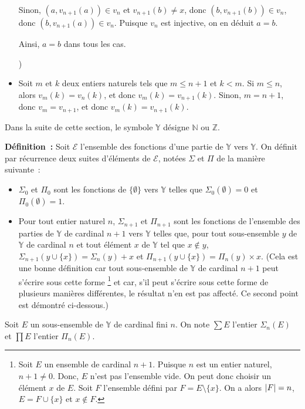 \begin{itemize}[nosep]
{            Sinon, $(a,v_{n+1}(a)) \in v_n$ et $v_{n+1}(b) \neq x$, donc $(b,v_{n+1}(b)) \in v_n$, donc $(b,v_{n+1}(a)) \in v_n$. 
            Puisque $v_n$ est injective, on en déduit $a = b$. 

            Ainsi, $a = b$ dans tous les cas.
            })
        \item Soit $m$ et $k$ deux entiers naturels tels que $m \leq n + 1$ et $k < m$. 
            Si $m \leq n$, alors $v_m(k) = v_n(k)$, et donc $v_m(k) = v_{n+1}(k)$. 
            Sinon, $m = n+1$, donc $v_m = v_{n+1}$, et donc $v_m(k) = v_{n+1}(k)$.
    \end{itemize}

   \done 

\medskip

Dans la suite de cette section, le symbole $\mathbb{Y}$ désigne $\mathbb{N}$ ou $\mathbb{Z}$.

\medskip

\noindent\textbf{Définition :} Soit $\mathcal{E}$ l'ensemble des fonctions d'une partie de $\mathbb{Y}$ vers $\mathbb{Y}$. 
    On définit par récurrence deux suites d'éléments de $\mathcal{E}$, notées $\Sigma$ et $\Pi$ de la manière suivante : 
    \begin{itemize}[nosep]
        \item $\Sigma_0$ et $\Pi_0$ sont les fonctions de $\lbrace \emptyset \rbrace$ vers $\mathbb{Y}$ telles que $\Sigma_0(\emptyset) = 0$ et $\Pi_0(\emptyset) = 1$.
        \item Pour tout entier naturel $n$, $\Sigma_{n+1}$ et $\Pi_{n+1}$ sont les fonctions de l'ensemble des parties de $\mathbb{Y}$ de cardinal $n+1$ vers $\mathbb{Y}$ telles que, pour tout sous-ensemble $y$ de $\mathbb{Y}$ de cardinal $n$ et tout élément $x$ de $\mathbb{Y}$ tel que $x \notin y$, $\Sigma_{n+1} (y \cup \lbrace x \rbrace) = \Sigma_n (y) + x$ et $\Pi_{n+1} (y \cup \lbrace x \rbrace) = \Pi_n (y) \times x$. 
        (Cela est une bonne définition car tout sous-ensemble de $\mathbb{Y}$ de cardinal $n+1$ peut s'écrire sous cette forme%
        \footnote{
            Soit $E$ un ensemble de cardinal $n+1$. 
            Puisque $n$ est un entier naturel, $n+1 \neq 0$. 
            Donc, $E$ n'est pas l'ensemble vide.
            On peut donc choisir un élément $x$ de $E$. 
            Soit $F$ l'ensemble défini par $F = E \setminus \lbrace x \rbrace$.
            On a alors $\left\lvert F \right\rvert = n$, $E = F \cup \lbrace x \rbrace$ et $x \notin F$.
        }
        et car, s'il peut s'écrire sous cette forme de plusieurs manières différentes, le résultat n'en est pas affecté. 
        Ce second point est démontré ci-dessous.)
    \end{itemize} 
    Soit $E$ un sous-ensemble de $\mathbb{Y}$ de cardinal fini $n$. 
    On note $\sum E$ l'entier $\Sigma_n (E)$ et $\prod E$ l'entier $\Pi_n(E)$.

